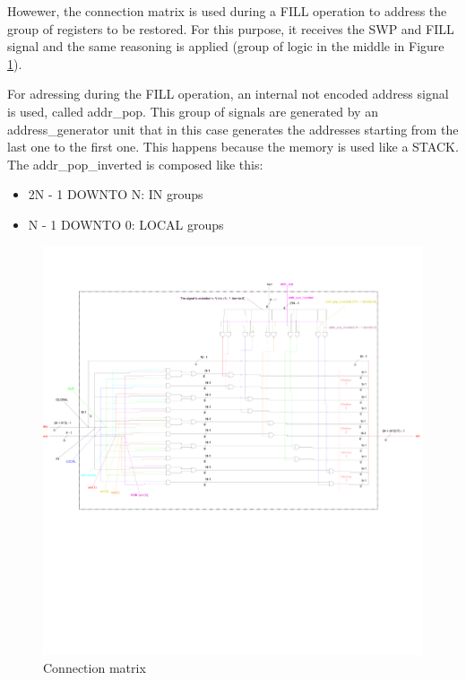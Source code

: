 Howewer, the connection matrix is used during a FILL operation to address the group of registers to be restored. For this purpose, it receives the SWP and FILL signal and the same reasoning is applied (group of logic in the middle in Figure \ref{connection_matrix}).

For adressing during the FILL operation, an internal not encoded address signal is used, called addr\_pop. This group of signals are generated by an address\_generator unit that in this case generates the addresses starting from the last one to the first one. This happens because the memory is used like a STACK.\\

The addr\_pop\_inverted is composed like this:
\begin{itemize}
  \item 2N - 1 DOWNTO N: IN groups 
  \item N - 1 DOWNTO 0: LOCAL groups
\end{itemize}

\begin{figure}[H]
  \centering
  \addtolength{\leftskip}{-3cm}
  \addtolength{\rightskip}{-3cm}
  \includegraphics[width=1.3\textwidth]{chapters/4_DecodeStage/images/connection_matrix.pdf}
  \caption{Connection matrix}
  \label{connection_matrix}
\end{figure}

